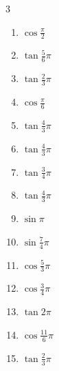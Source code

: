 \begin{multicols}{3}
\begin{enumerate}
  \item $\displaystyle \cos{\frac{\pi}{2}}$
        \phantom{$\displaystyle =0$}

  \item $\displaystyle \tan{\frac{5}{6}\pi}$

  \item $\displaystyle \tan{\frac{2}{3}\pi}$

  \item $\displaystyle \cos{\frac{\pi}{6}}$

  \item $\displaystyle \tan{\frac{4}{3}\pi}$

  \item $\displaystyle \tan{\frac{4}{3}\pi}$

\columnbreak %

  \item $\displaystyle \tan{\frac{3}{4}\pi}$
        \phantom{$\displaystyle =-1$}

  \item $\displaystyle \tan{\frac{4}{3}\pi}$

  \item $\displaystyle \sin{\pi}$
        \phantom{$\displaystyle =0$}

  \item $\displaystyle \sin{\frac{7}{4}\pi}$

  \item $\displaystyle \cos{\frac{5}{3}\pi}$

  \item $\displaystyle \cos{\frac{3}{4}\pi}$

  \item $\displaystyle \tan{2\pi}$
        \phantom{$\displaystyle =0$}

  \item $\displaystyle \cos{\frac{11}{6}\pi}$

  \item $\displaystyle \tan{\frac{2}{3}\pi}$


\end{enumerate}
\end{multicols}
